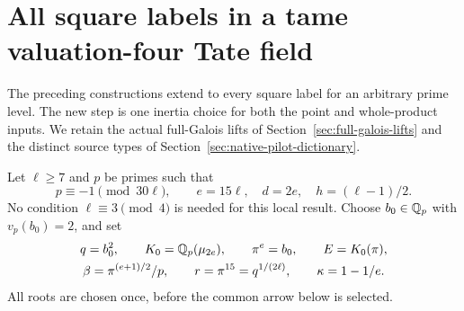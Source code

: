 \section{All square labels in a tame valuation-four Tate field}
\label{sec:general-tame-square-labels}

The preceding constructions extend to every square label for an
arbitrary prime level. The new step is one inertia choice for both
the point and whole-product inputs. We retain the actual full-Galois
lifts of Section~\ref{sec:full-galois-lifts} and the distinct source
types of Section~\ref{sec:native-pilot-dictionary}.

Let $\ell\ge7$ and $p$ be primes such that
\[
 p\equiv-1\pmod{30\ell},\qquad
 e=15\ell,\quad d=2e,\quad h=(\ell-1)/2.
\]
No condition $\ell\equiv3\pmod4$ is needed for this local result.
Choose $b_0\in\mathbb Q_p$ with $v_p(b_0)=2$, and set
\begin{equation}\label{eq:gs-field-data}
 \begin{gathered}
 q=b_0^2,\qquad K_0=\mathbb Q_p(\mu_{2e}),\qquad
 \pi^e=b_0,\qquad E=K_0(\pi),\\
 \beta=\pi^{(e+1)/2}/p,\qquad
 r=\pi^{15}=q^{1/(2\ell)},\qquad
 \kappa=1-1/e.
 \end{gathered}
\end{equation}
All roots are chosen once, before the common arrow below is selected.

